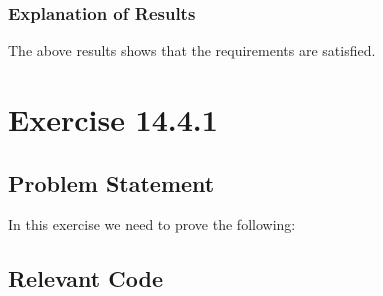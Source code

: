 \documentclass{report}
\begin{document}
\subsection{Explanation of Results}
\label{sec:explanation-results-2}
The above results shows that the requirements are satisfied.



 \chapter{Exercise 14.4.1}
 \label{cha:exercise-11.6.3}
  
 \section{Problem Statement}
 \label{sec:problem-statement-3}

In this exercise we need to prove the following:  
\HOLconopsZeroSolutionDatatypescommands
\HOLconopsZeroSolutionTheoremsOpRuleLaunchXXthm
\HOLconopsZeroSolutionTheoremsOpRuleAbortXXthm
\HOLconopsZeroSolutionTheoremsApRuleActivateXXthm
\HOLconopsZeroSolutionTheoremsApRuleStandDownXXthm


\section{Relevant Code}
\label{sec:relevant-code-3}

\end{document}
